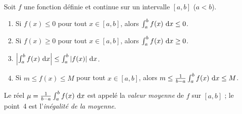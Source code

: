 	      \begin{prop}
	            Soit $f$ une fonction d\'efinie et continue sur un intervalle $[a,b]$ ($a<b$).
	            \begin{enumerate}
	                  \item Si $ f(x) \leq 0$ pour tout $x\in [a,b]$, alors $\int_{a}^{b} f(x) ~\mathrm{d}x \leq 0$.
	                  \item Si $ f(x) \geq 0$ pour tout $ x\in [a,b]$, alors $\int_{a}^{b} f(x) ~\mathrm{d}x \geq 0$.
	                  \item $ \left\lvert \int_{a}^{b} f(x) ~\mathrm{d}x \right\rvert \leq \int_{a}^{b} |f(x)| ~\mathrm{d}x $.
	                  \item Si $m\leq f(x) \leq M$ pour tout $x\in [a,b]$, 
	                        alors $ m \leq \frac{1}{b-a} \int_{a}^{b} f(x) ~\mathrm{d}x \leq M$.
	            \end{enumerate}
	            Le r\'eel $\mu = \frac{1}{b-a} \int_{a}^{b} f(x) ~\mathrm{d}x$ est appel\'e la \emph{valeur moyenne} de $f$ sur $[a,b]$ ;
	            le point~4 est l'\emph{in\'egalit\'e de la moyenne}.
	      \end{prop}
